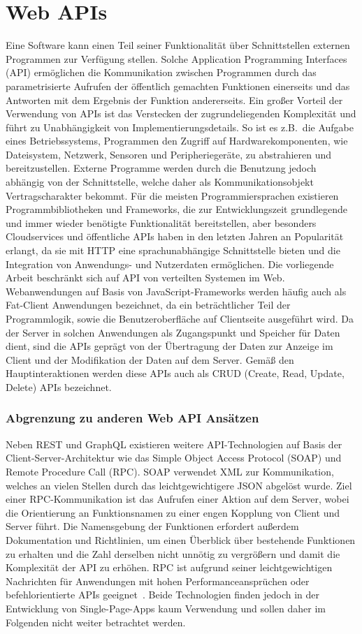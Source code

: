 \section{Web APIs}
Eine Software kann einen Teil seiner Funktionalität über Schnittstellen externen Programmen zur Verfügung stellen.
Solche Application Programming Interfaces (API) ermöglichen die Kommunikation zwischen Programmen durch das parametrisierte Aufrufen der öffentlich gemachten Funktionen einerseits und das Antworten mit dem Ergebnis der Funktion andererseits.
Ein großer Vorteil der Verwendung von APIs ist das Verstecken der zugrundeliegenden Komplexität und führt zu Unabhängigkeit von Implementierungsdetails.
So ist es z.B.\ die Aufgabe eines Betriebssystems, Programmen den Zugriff auf Hardwarekomponenten, wie Dateisystem, Netzwerk, Sensoren und Peripheriegeräte, zu abstrahieren und bereitzustellen.
Externe Programme werden durch die Benutzung jedoch abhängig von der Schnittstelle, welche daher als Kommunikationsobjekt Vertragscharakter bekommt.
Für die meisten Programmiersprachen existieren Programmbibliotheken und Frameworks, die zur Entwicklungszeit grundlegende und immer wieder benötigte Funktionalität bereitstellen, aber besonders Cloudservices und öffentliche APIs haben in den letzten Jahren an Popularität erlangt, da sie mit HTTP eine sprachunabhängige Schnittstelle bieten und die Integration von Anwendungs- und Nutzerdaten ermöglichen.
Die vorliegende Arbeit beschränkt sich auf API von verteilten Systemen im Web.
Webanwendungen auf Basis von JavaScript-Frameworks werden häufig auch als Fat-Client Anwendungen bezeichnet, da ein beträchtlicher Teil der Programmlogik, sowie die Benutzeroberfläche auf Clientseite ausgeführt wird.
Da der Server in solchen Anwendungen als Zugangspunkt und Speicher für Daten dient, sind die APIs geprägt von der Übertragung der Daten zur Anzeige im Client und der Modifikation der Daten auf dem Server.
Gemäß den Hauptinteraktionen werden diese APIs auch als CRUD (Create, Read, Update, Delete) APIs bezeichnet.
\subsubsection{Abgrenzung zu anderen Web API Ansätzen}
Neben REST und GraphQL existieren weitere API-Technologien auf Basis der Client-Server-Architektur wie das Simple Object Access Protocol (SOAP) und Remote Procedure Call (RPC).
SOAP verwendet XML zur Kommunikation, welches an vielen Stellen durch das leichtgewichtigere JSON abgelöst wurde.
Ziel einer RPC-Kommunikation ist das Aufrufen einer Aktion auf dem Server, wobei die Orientierung an Funktionsnamen zu einer engen Kopplung von Client und Server führt.
Die Namensgebung der Funktionen erfordert außerdem Dokumentation und Richtlinien, um einen Überblick über bestehende Funktionen zu erhalten und die Zahl derselben nicht unnötig zu vergrößern und damit die Komplexität der API zu erhöhen.
RPC ist aufgrund seiner leichtgewichtigen Nachrichten für Anwendungen mit hohen Performanceansprüchen oder befehlorientierte APIs geeignet~\cite[vgl.]{Barbettini}.
Beide Technologien finden jedoch in der Entwicklung von Single-Page-Apps kaum Verwendung und sollen daher im Folgenden nicht weiter betrachtet werden.
